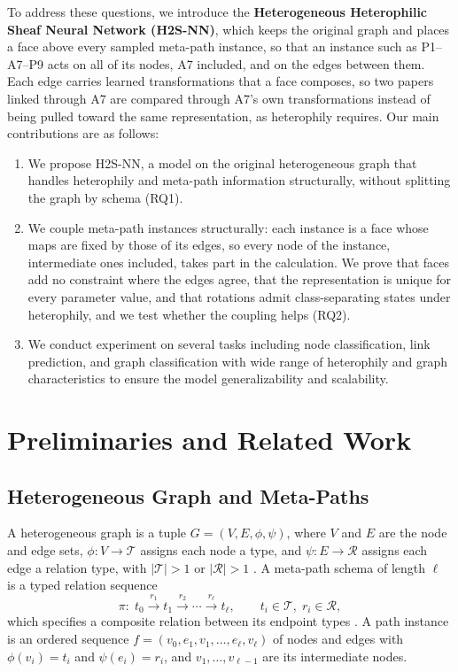 \documentclass{article}
\newcommand{\method}{\textsc{H2S-NN}}
\begin{document}
To address these questions, we introduce the \textbf{Heterogeneous Heterophilic Sheaf Neural Network (\method{})}, which keeps the original graph and places a face above every sampled meta-path instance, so that an instance such as P1--A7--P9 acts on all of its nodes, A7 included, and on the edges between them. Each edge carries learned transformations that a face composes, so two papers linked through A7 are compared through A7's own transformations instead of being pulled toward the same representation, as heterophily requires. Our main contributions are as follows:
\begin{enumerate}
\item We propose \method{}, a model on the original heterogeneous graph that handles heterophily and meta-path information structurally, without splitting the graph by schema (RQ1).
\item We couple meta-path instances structurally: each instance is a face whose maps are fixed by those of its edges, so every node of the instance, intermediate ones included, takes part in the calculation. We prove that faces add no constraint where the edges agree, that the representation is unique for every parameter value, and that rotations admit class-separating states under heterophily, and we test whether the coupling helps (RQ2).
\item We conduct experiment on several tasks including node classification, link prediction, and graph classification with wide range of heterophily and graph characteristics to ensure the model generalizability and scalability.
\end{enumerate}



\section{Preliminaries and Related Work}
\label{sec:background}

\subsection{Heterogeneous Graph and Meta-Paths}
A heterogeneous graph is a tuple $G=(V,E,\phi,\psi)$, where $V$ and $E$ are the node and edge sets, $\phi:V\rightarrow\mathcal{T}$ assigns each node a type, and $\psi:E\rightarrow\mathcal{R}$ assigns each edge a relation type, with $|\mathcal{T}|>1$ or $|\mathcal{R}|>1$ \cite{lu2026addressing}. A meta-path schema of length $\ell$ is a typed relation sequence
\begin{equation}
  \pi:\;
  t_0 \xrightarrow{r_1} t_1 \xrightarrow{r_2}\cdots
  \xrightarrow{r_\ell} t_\ell,
  \qquad t_i\in\mathcal{T},\; r_i\in\mathcal{R},
  \label{eq:schema}
\end{equation}
which specifies a composite relation between its endpoint types \cite{sun2011pathsim}. A path instance is an ordered sequence $f=(v_0,e_1,v_1,\ldots,e_\ell,v_\ell)$ of nodes and edges with $\phi(v_i)=t_i$ and $\psi(e_i)=r_i$, and $v_1,\ldots,v_{\ell-1}$ are its intermediate nodes.
\end{document}
